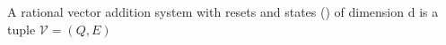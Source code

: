 
\begin{mydef}
A rational vector addition system with resets and states (\qvasrs) of dimension d is a tuple $\mathcal{V} = (Q, E)$
\end{mydef}

\begin{example}
    
\end{example}